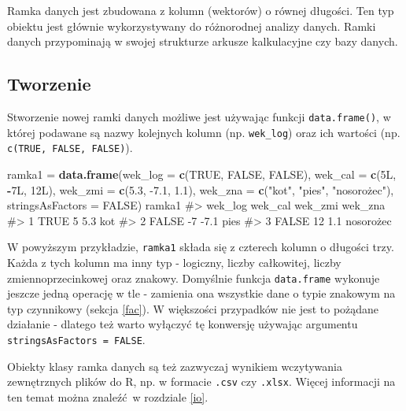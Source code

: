 \documentclass[paper=6in:9in,pagesize=pdftex,headinclude=on,footinclude=on,10pt]{scrbook}
\makeatletter
\newenvironment{Shaded}{\begin{snugshade}}{\end{snugshade}}
\newcommand{\DataTypeTok}[1]{\textcolor[rgb]{0.13,0.29,0.53}{#1}}
\newcommand{\FloatTok}[1]{\textcolor[rgb]{0.00,0.00,0.81}{#1}}
\newcommand{\KeywordTok}[1]{\textcolor[rgb]{0.13,0.29,0.53}{\textbf{#1}}}
\newcommand{\NormalTok}[1]{#1}
\newcommand{\OperatorTok}[1]{\textcolor[rgb]{0.81,0.36,0.00}{\textbf{#1}}}
\newcommand{\OtherTok}[1]{\textcolor[rgb]{0.56,0.35,0.01}{#1}}
\newcommand{\StringTok}[1]{\textcolor[rgb]{0.31,0.60,0.02}{#1}}
\newenvironment{kframe}{%
\medskip{}
\setlength{\fboxsep}{.8em}
 \def\at@end@of@kframe{}%
 \ifinner\ifhmode%
  \def\at@end@of@kframe{\end{minipage}}%
  \begin{minipage}{\columnwidth}%
 \fi\fi%
 \def\FrameCommand##1{\hskip\@totalleftmargin \hskip-\fboxsep
 \colorbox{shadecolor}{##1}\hskip-\fboxsep
     \hskip-\linewidth \hskip-\@totalleftmargin \hskip\columnwidth}%
 \MakeFramed {\advance\hsize-\width
   \@totalleftmargin\z@ \linewidth\hsize
   \@setminipage}}%
 {\par\unskip\endMakeFramed%
 \at@end@of@kframe}
\newenvironment{rmdblock}[1]
  {
  \begin{itemize}
  \renewcommand{\labelitemi}{
    \raisebox{-.7\height}[0pt][0pt]{
      {\setkeys{Gin}{width=3em,keepaspectratio}\texttt{[image: images/\#1]}}
    }
  }
  \setlength{\fboxsep}{1em}
  \begin{kframe}
  \item
  }
  {
  \end{kframe}
  \end{itemize}
  }
\newenvironment{rmdinfo}
  {\begin{rmdblock}{compass}}
  {\end{rmdblock}}
\makeatother
\begin{document}
Ramka danych jest zbudowana z kolumn (wektorów) o równej długości.
Ten typ obiektu jest głównie wykorzystywany do różnorodnej analizy danych.
Ramki danych przypominają w swojej strukturze arkusze kalkulacyjne czy bazy danych.

\hypertarget{tworzenie-1}{%
\subsection{Tworzenie}\label{tworzenie-1}}

Stworzenie nowej ramki danych możliwe jest używając funkcji \texttt{data.frame()}, w której podawane są nazwy kolejnych kolumn (np. \texttt{wek\_log}) oraz ich wartości (np. \texttt{c(TRUE,\ FALSE,\ FALSE)}).

\begin{Shaded}
\begin{Highlighting}[]
\NormalTok{ramka1 =}\StringTok{ }\KeywordTok{data.frame}\NormalTok{(}\DataTypeTok{wek_log =} \KeywordTok{c}\NormalTok{(}\OtherTok{TRUE}\NormalTok{, }\OtherTok{FALSE}\NormalTok{, }\OtherTok{FALSE}\NormalTok{),}
                    \DataTypeTok{wek_cal =} \KeywordTok{c}\NormalTok{(5L, }\OperatorTok{-}\NormalTok{7L, 12L), }
                    \DataTypeTok{wek_zmi =} \KeywordTok{c}\NormalTok{(}\FloatTok{5.3}\NormalTok{, }\FloatTok{-7.1}\NormalTok{, }\FloatTok{1.1}\NormalTok{), }
                    \DataTypeTok{wek_zna =} \KeywordTok{c}\NormalTok{(}\StringTok{"kot"}\NormalTok{, }\StringTok{"pies"}\NormalTok{, }\StringTok{"nosorożec"),}
\StringTok{                    stringsAsFactors = FALSE)}
\StringTok{ramka1}
\StringTok{#>   wek_log wek_cal wek_zmi   wek_zna}
\StringTok{#> 1    TRUE       5     5.3       kot}
\StringTok{#> 2   FALSE      -7    -7.1      pies}
\StringTok{#> 3   FALSE      12     1.1 nosorożec}
\end{Highlighting}
\end{Shaded}

W powyższym przykładzie, \texttt{ramka1} składa się z czterech kolumn o długości trzy.
Każda z tych kolumn ma inny typ - logiczny, liczby całkowitej, liczby zmiennoprzecinkowej oraz znakowy.
Domyślnie funkcja \texttt{data.frame} wykonuje jeszcze jedną operację w tle - zamienia ona wszystkie dane o typie znakowym na typ czynnikowy (sekcja \ref{fac}).
W większości przypadków nie jest to pożądane działanie - dlatego też warto wyłączyć tę konwersję używając argumentu \texttt{stringsAsFactors\ =\ FALSE}.

\begin{rmdinfo}
\begin{rmdinfo}

Obiekty klasy ramka danych są też zazwyczaj wynikiem wczytywania zewnętrznych plików do R, np. w formacie \texttt{.csv} czy \texttt{.xlsx}.
Więcej informacji na ten temat można znaleźć~w rozdziale \ref{io}.

\end{rmdinfo}
\end{rmdinfo}
\end{document}
